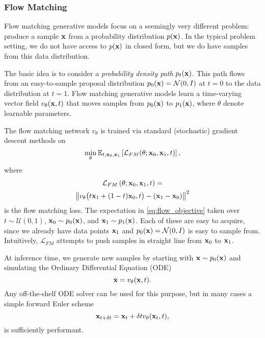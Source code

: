 \documentclass[letterpaper, 10 pt]{ieeeconf}
\begin{document}
\subsubsection{Flow Matching}\label{sec:flow}

Flow matching generative models \cite{lipman2022flow} focus on a seemingly very different problem: produce a sample $\mathbf{x}$ from a probability distribution $p(\mathbf{x})$. In the typical problem setting, we do not have access to $p(\mathbf{x})$ in closed form, but we do have samples from this data distribution.

The basic idea is to consider a \textit{probability density path} $p_t(\mathbf{x})$. This path flows from an easy-to-sample proposal distribution $p_0(\mathbf{x}) = \mathcal{N}(0, I)$ at $t = 0$ to the data distribution at $t = 1$. Flow matching generative models learn a time-varying vector field $v_\theta(\mathbf{x}, t)$ that moves samples from $p_0(\mathbf{x})$ to $p_1(\mathbf{x})$, where $\theta$ denote learnable parameters.

The flow matching network $v_\theta$ is trained via standard (stochastic) gradient descent methods on
\begin{equation}\label{eq:flow_objective}
    \min_{\theta} \mathbb{E}_{t, \mathbf{x}_0, \mathbf{x}_1} \left[\mathcal{L}_{FM}(\theta; \mathbf{x}_0, \mathbf{x}_1, t)\right],
\end{equation}
where
\begin{multline}\label{eq:flow_loss}
    \mathcal{L}_{FM}\left(\theta; \mathbf{x}_0, \mathbf{x}_1, t \right) = \\
    \left\| v_\theta\big(t \mathbf{x}_1 + (1-t)\mathbf{x}_0, t\big) - (\mathbf{x}_1 - \mathbf{x}_0) \right\|^2
\end{multline}
is the flow matching loss. The expectation in \eqref{eq:flow_objective} taken over $t \sim \mathcal{U}(0, 1)$, $\mathbf{x}_0 \sim p_0(\mathbf{x})$, and $\mathbf{x}_1 \sim p_1(\mathbf{x})$. Each of these are easy to acquire, since we already have data points $\mathbf{x}_1$ and $p_0(\mathbf{x}) = \mathcal{N}(0, I)$ is easy to sample from. Intuitively, $\mathcal{L}_{FM}$ attempts to push samples in straight line from $\mathbf{x}_0$ to $\mathbf{x}_1$.

At inference time, we generate new samples by starting with $\mathbf{x} \sim p_0(\mathbf{x})$ and simulating the Ordinary Differential Equation (ODE)
\begin{equation}
    \dot{\mathbf{x}} = v_\theta(\mathbf{x}, t).
\end{equation}
Any off-the-shelf ODE solver can be used for this purpose, but in many cases a simple forward Euler scheme
\begin{equation}
    \mathbf{x}_{t+\delta t} = \mathbf{x}_t + \delta t v_\theta(\mathbf{x}_t, t),
\end{equation}
is sufficiently performant.
\end{document}
